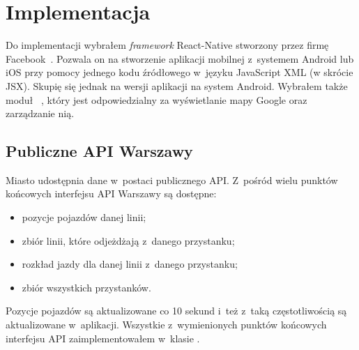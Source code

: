 \documentclass{SGGW-thesis}
\begin{document}
\chapter{Implementacja}
Do implementacji wybrałem \textit{framework} React-Native stworzony przez firmę Facebook~\cite{REACT}.
Pozwala on na stworzenie aplikacji mobilnej z~systemem Android lub iOS przy pomocy jednego kodu źródłowego w~języku JavaScript XML (w skrócie JSX).
Skupię się jednak na wersji aplikacji na system Android.
Wybrałem także moduł ~\cite{REACTMAPS}, który jest odpowiedzialny za wyświetlanie mapy Google oraz zarządzanie nią.

\section{Publiczne API Warszawy}
Miasto udostępnia dane w~postaci publicznego API.
Z~pośród wielu punktów końcowych interfejsu API Warszawy są dostępne:
\begin{itemize}
  \item{pozycje pojazdów danej linii;}
  \item{zbiór linii, które odjeżdżają z~danego przystanku;}
  \item{rozkład jazdy dla danej linii z~danego przystanku;}
  \item{zbiór wszystkich przystanków.}
\end{itemize}
Pozycje pojazdów są aktualizowane co 10 sekund i~też z~taką częstotliwością są aktualizowane w~aplikacji.
Wszystkie z~wymienionych punktów końcowych interfejsu API zaimplementowałem w~klasie .
\end{document}
